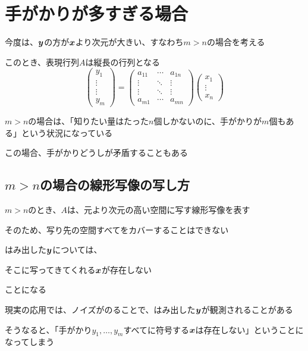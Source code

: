 \documentclass[../../../topic_linear-algebra]{subfiles}
\begin{document}
\sectionline
\section{手がかりが多すぎる場合}

今度は、$\vb*{y}$の方が$\vb*{x}$より次元が大きい、すなわち$m > n$の場合を考える

このとき、表現行列$A$は縦長の行列となる
\begin{equation*}
  \begin{pmatrix}
    y_1    \\
    \vdots \\
    \vdots \\
    y_m
  \end{pmatrix} = \begin{pmatrix}
    a_{11} & \cdots & a_{1n} \\
    \vdots & \ddots & \vdots \\
    \vdots & \ddots & \vdots \\
    a_{m1} & \cdots & a_{mn}
  \end{pmatrix} \begin{pmatrix}
    x_1    \\
    \vdots \\
    x_n
  \end{pmatrix}
\end{equation*}

$m > n$の場合は、「知りたい量はたった$n$個しかないのに、手がかりが$m$個もある」という状況になっている

この場合、手がかりどうしが矛盾することもある

\subsection{$m > n$の場合の線形写像の写し方}

$m > n$のとき、$A$は、元より次元の高い空間に写す線形写像を表す

そのため、写り先の空間すべてをカバーすることはできない

\br

はみ出した$\vb*{y}$については、
\begin{shaded}
  そこに写ってきてくれる$\vb*{x}$が存在しない
\end{shaded}
ことになる

\br

現実の応用では、ノイズがのることで、はみ出した$\vb*{y}$が観測されることがある

そうなると、「手がかり$y_1,\ldots,y_m$すべてに符号する$\vb*{x}$は存在しない」ということになってしまう
\end{document}

